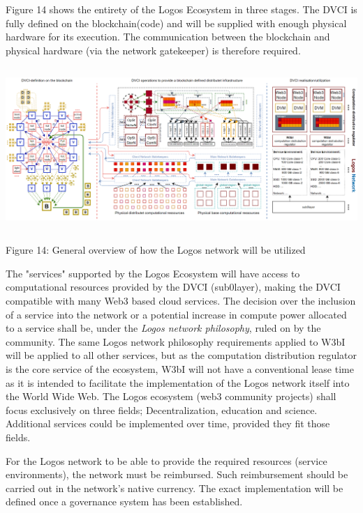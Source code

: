 \documentclass[]{article}
\begin{document}
Figure 14 shows the entirety of the Logos Ecosystem in three stages.
The DVCI is fully defined on the blockchain(code) and will be supplied with enough physical hardware for its execution. 
The communication between the blockchain and physical hardware (via the network gatekeeper) is therefore required.    

\begin{center}
	\includegraphics[height=6.2cm]{network-realisation}
\end{center}
\begin{center}
	Figure 14: General overview of how the Logos network will be utilized
\end{center}

The "services" supported by the Logos Ecosystem will have access to computational resources provided by the DVCI (sub0layer), making the DVCI compatible with many Web3 based cloud services.
The decision over the inclusion of a service into the network or a potential increase in compute power allocated to a service shall be, under the \textit{Logos network philosophy}, ruled on by the community.
The same Logos network philosophy requirements applied to W3bI will be applied to all other services, but as the computation distribution regulator is the core service of the ecosystem, W3bI will not have a conventional lease time as it is intended to facilitate the implementation of the Logos network itself into the World Wide Web.
The Logos ecosystem (web3 community projects) shall focus exclusively on three fields; Decentralization, education and science.
Additional services could be implemented over time, provided they fit those fields.

For the Logos network to be able to provide the required resources (service environments), the network must be reimbursed.
Such reimbursement should be carried out in the network's native currency.
The exact implementation will be defined once a governance system has been established. 
\end{document}
